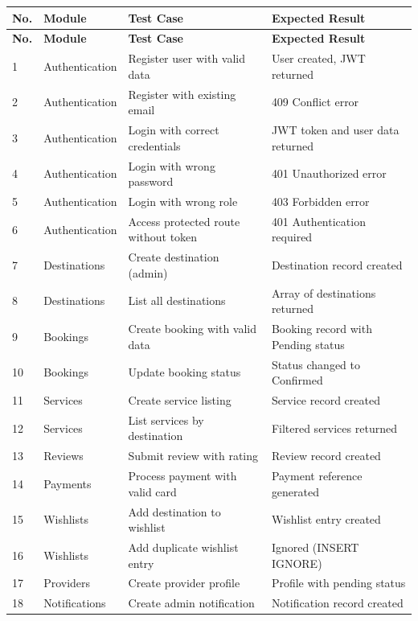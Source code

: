 \begin{longtable}{|p{0.5cm}|p{3.5cm}|p{5cm}|p{3.5cm}|}
\hline
\textbf{No.} & \textbf{Module} & \textbf{Test Case} & \textbf{Expected Result} \\
\hline
\endfirsthead
\hline
\textbf{No.} & \textbf{Module} & \textbf{Test Case} & \textbf{Expected Result} \\
\hline
\endhead
1 & Authentication & Register user with valid data & User created, JWT returned \\
\hline
2 & Authentication & Register with existing email & 409 Conflict error \\
\hline
3 & Authentication & Login with correct credentials & JWT token and user data returned \\
\hline
4 & Authentication & Login with wrong password & 401 Unauthorized error \\
\hline
5 & Authentication & Login with wrong role & 403 Forbidden error \\
\hline
6 & Authentication & Access protected route without token & 401 Authentication required \\
\hline
7 & Destinations & Create destination (admin) & Destination record created \\
\hline
8 & Destinations & List all destinations & Array of destinations returned \\
\hline
9 & Bookings & Create booking with valid data & Booking record with Pending status \\
\hline
10 & Bookings & Update booking status & Status changed to Confirmed \\
\hline
11 & Services & Create service listing & Service record created \\
\hline
12 & Services & List services by destination & Filtered services returned \\
\hline
13 & Reviews & Submit review with rating & Review record created \\
\hline
14 & Payments & Process payment with valid card & Payment reference generated \\
\hline
15 & Wishlists & Add destination to wishlist & Wishlist entry created \\
\hline
16 & Wishlists & Add duplicate wishlist entry & Ignored (INSERT IGNORE) \\
\hline
17 & Providers & Create provider profile & Profile with pending status \\
\hline
18 & Notifications & Create admin notification & Notification record created \\
\hline
\end{longtable}

